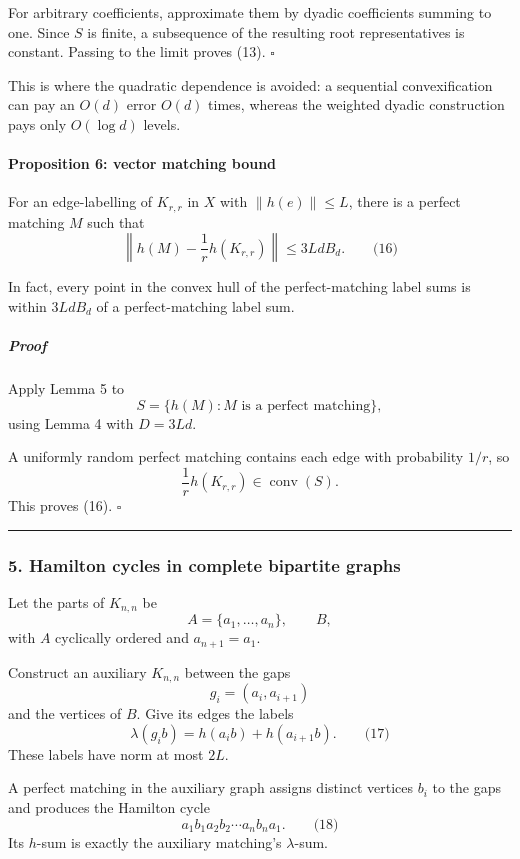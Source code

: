\documentclass[
  11pt,
  a4paper,
]{article}
\begin{document}
For arbitrary coefficients, approximate them by dyadic coefficients
summing to one. Since \(S\) is finite, a subsequence of the resulting
root representatives is constant. Passing to the limit proves (13).
\(\square\)

This is where the quadratic dependence is avoided: a sequential
convexification can pay an \(O(d)\) error \(O(d)\) times, whereas the
weighted dyadic construction pays only \(O(\log d)\) levels.

\paragraph{Proposition 6: vector matching
bound}\label{proposition-6-vector-matching-bound}

For an edge-labelling of \(K_{r,r}\) in \(X\) with \(\|h(e)\|\le L\),
there is a perfect matching \(M\) such that \[
\left\|h(M)-\frac1r h(K_{r,r})\right\|
\le 3LdB_d.
\qquad\text{(16)}
\]

In fact, every point in the convex hull of the perfect-matching label
sums is within \(3LdB_d\) of a perfect-matching label sum.

\subparagraph{Proof}\label{proof-3}

Apply Lemma 5 to \[
S=\{h(M):M\text{ is a perfect matching}\},
\] using Lemma 4 with \(D=3Ld\).

A uniformly random perfect matching contains each edge with probability
\(1/r\), so \[
\frac1r h(K_{r,r})\in\operatorname{conv}(S).
\] This proves (16). \(\square\)

\begin{center}\rule{0.5\linewidth}{0.5pt}\end{center}

\subsubsection{5. Hamilton cycles in complete bipartite
graphs}\label{hamilton-cycles-in-complete-bipartite-graphs}

Let the parts of \(K_{n,n}\) be \[
A=\{a_1,\ldots,a_n\},\qquad B,
\] with \(A\) cyclically ordered and \(a_{n+1}=a_1\).

Construct an auxiliary \(K_{n,n}\) between the gaps \[
g_i=(a_i,a_{i+1})
\] and the vertices of \(B\). Give its edges the labels \[
\lambda(g_i b)=h(a_i b)+h(a_{i+1}b).
\qquad\text{(17)}
\] These labels have norm at most \(2L\).

A perfect matching in the auxiliary graph assigns distinct vertices
\(b_i\) to the gaps and produces the Hamilton cycle \[
a_1b_1a_2b_2\cdots a_nb_na_1.
\qquad\text{(18)}
\] Its \(h\)-sum is exactly the auxiliary matching's \(\lambda\)-sum.
\end{document}
